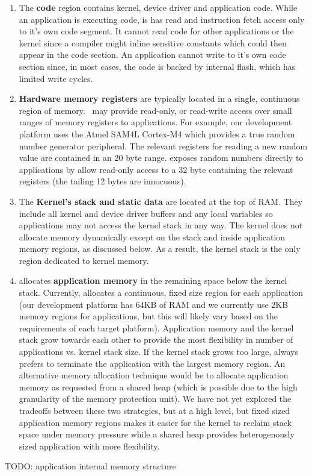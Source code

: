 \begin{enumerate}
  \item The {\bf code} region contains kernel, device driver and application
    code. While an application is executing code, is has read and instruction
    fetch access only to it's own code segment. It cannot read code for other
    applications or the kernel since a compiler might inline sensitive constants
    which could then appear in the code section. An application cannot write to
    it's own code section since, in most cases, the code is backed by internal
    flash, which has limited write cycles.

  \item {\bf Hardware memory registers} are typically located in a single,
    continuous region of memory.~ \name may provide
    read-only, or read-write access over small ranges of memory registers to
    applications. For example, our development platform uses the Atmel SAM4L
    Cortex-M4 which provides a true random number generator peripheral. The
    relevant registers for reading a new random value are contained in an 20
    byte range.  \name exposes random numbers directly to applications by allow
    read-only access to a 32 byte containing the relevant registers (the tailing
    12 bytes are innocuous).

  \item The {\bf Kernel's stack and static data} are located at the top of RAM.
    They include all kernel and device driver buffers and any local variables so
    applications may not access the kernel stack in any way. The kernel does not
    allocate memory dynamically except on the stack and inside application
    memory regions, as discussed below. As a result, the kernel stack is the
    only region dedicated to kernel memory.

  \item \name allocates {\bf application memory} in the remaining space below
    the kernel stack. Currently, \name allocates a continuous, fixed size region
    for each application (our development platform has 64KB of RAM and we
    currently use 2KB memory regions for applications, but this will likely vary
    based on the requirements of each target platform). Application memory and
    the kernel stack grow towards each other to provide the most flexibility in
    number of applications vs. kernel stack size. If the kernel stack grows too
    large, \name always prefers to terminate the application with the largest
    memory region. An alternative memory allocation technique would be to
    allocate application memory as requested from a shared heap (which is
    possible due to the high granularity of the memory protection unit). We have
    not yet explored the tradeoffs between these two strategies, but at a high
    level, but fixed sized application memory regions makes it easier for the
    kernel to reclaim stack space under memory pressure while a shared heap
    provides heterogenously sized application with more flexibility.

\end{enumerate}

TODO: application internal memory structure
